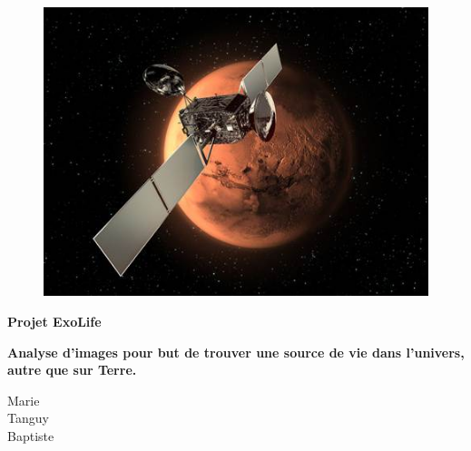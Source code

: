 \documentclass[12pt]{article}
\begin{document}
\begin{figure}
	\centering
	\includegraphics[scale=0.8]{images/logo.jpg}
\end{figure}

\hspace{\fill}

\begin{center}
	\LARGE{\textbf{Projet ExoLife}}
\end{center}


\begin{center}
\textbf{Analyse d'images pour but de trouver une source de vie dans l'univers, autre que sur Terre.}\\
\end{center}

\vspace{\fill}

\begin{flushright}
	 Marie\\
	 Tanguy\\
	 Baptiste\\
\end{flushright}

\clearpage

\tableofcontents

\clearpage

\clearpage

\clearpage

\clearpage

\clearpage

\clearpage

\clearpage

\clearpage

\clearpage

\clearpage

\clearpage

\clearpage

\clearpage
\end{document}
